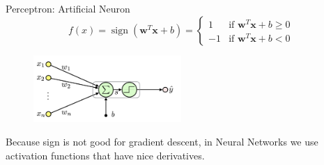 \documentclass{beamer}
\DeclareMathOperator{\sign}{sign}
\begin{document}
\begin{frame}{Perceptron: Artificial Neuron}
    $$
        f\left(x\right) = \sign\left(\boldsymbol{w}^T\boldsymbol{x} + b\right) = \begin{cases}
            1  & \text{if } \boldsymbol{w}^T\boldsymbol{x} + b \geq 0 \\
            -1 & \text{if } \boldsymbol{w}^T\boldsymbol{x} + b < 0
        \end{cases}
    $$
    \begin{figure}
        \centering
        \includegraphics[width=0.5\textwidth]{./images/11_perceptron.png}
    \end{figure}
    Because sign is not good for gradient descent, in Neural Networks we use activation functions that have nice derivatives.
\end{frame}
\end{document}
